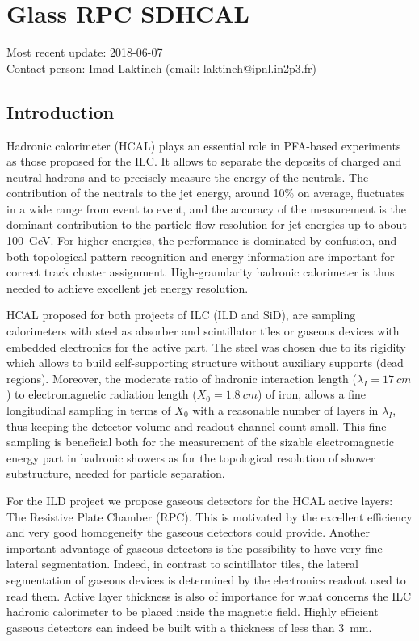\section{Glass RPC SDHCAL}
Most recent update: 2018-06-07 \\
Contact person: Imad Laktineh (email: laktineh@ipnl.in2p3.fr)
\subsection{Introduction}

Hadronic calorimeter (HCAL) plays an essential role in PFA-based experiments as
those proposed for the ILC. It allows to separate the deposits of charged and
neutral hadrons and to precisely measure the energy of the neutrals. The
contribution of the neutrals to the jet energy, around 10\% on average,
fluctuates in a wide range from event to event, and the accuracy of the
measurement is the dominant contribution to the particle flow resolution for jet
energies up to about \SI{100}{GeV}. For higher energies, the performance is
dominated by confusion, and both topological pattern recognition and energy
information are important for correct track cluster assignment.
High-granularity hadronic calorimeter is thus needed to achieve excellent jet
energy resolution.

HCAL proposed for both projects of ILC (ILD and SiD), are sampling calorimeters
with steel as absorber and scintillator tiles or gaseous devices with embedded
electronics for the active part. The steel was chosen due to its rigidity which
allows to build self-supporting structure without auxiliary supports (dead
regions). Moreover, the moderate ratio of hadronic interaction length
($\lambda_I = \SI{17}{cm}$) to electromagnetic radiation length ($X_0 = \SI{1.8}{cm}$) of
iron, allows a fine longitudinal sampling in terms of $X_0$ with a reasonable
number of layers in $\lambda_I$, thus keeping the detector volume and readout
channel count small. This fine sampling is beneficial both for the measurement
of the sizable electromagnetic energy part in hadronic showers as for the
topological resolution of shower substructure, needed for particle separation.

For the ILD project we propose gaseous detectors for the HCAL active layers: The
Resistive Plate Chamber (RPC). This is motivated by the excellent efficiency
and very good homogeneity the gaseous detectors could provide. Another
important advantage of gaseous detectors is the possibility to have very fine
lateral segmentation. Indeed, in contrast to scintillator tiles, the lateral
segmentation of gaseous devices is determined by the electronics readout used to
read them. Active layer thickness is also of importance for what concerns the
ILC hadronic calorimeter to be placed inside the magnetic field. Highly
efficient gaseous detectors can indeed be built with a thickness of less than
\SI{3}{mm}.

